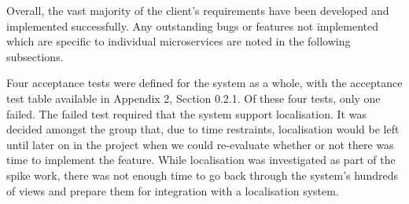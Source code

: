 Overall, the vast majority of the client's requirements have been developed and implemented successfully. Any outstanding bugs or features not implemented which are specific to individual microservices are noted in the following subsections.

Four acceptance tests were defined for the system as a whole, with the acceptance test table available in Appendix 2, Section 0.2.1. Of these four tests, only one failed. The failed test required that the system support localisation. It was decided amongst the group that, due to time restraints, localisation would be left until later on in the project when we could re-evaluate whether or not there was time to implement the feature. While localisation was investigated as part of the spike work, there was not enough time to go back through the system's hundreds of views and prepare them for integration with a localisation system. 